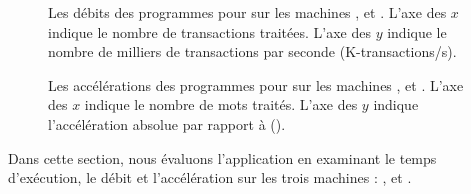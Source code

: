 \begin{figure}




\caption[Les débits pour  sur
les machines ,  et .]{Les débits des programmes
pour  sur les machines ,  et . L'axe des $x$
indique le nombre de transactions traitées. L'axe des $y$ indique le nombre de milliers de transactions par seconde (K-transactions/s).}
\label{StockPrice-debits.fig}
\end{figure}


\begin{figure}




\caption[Les accélérations pour  sur les machines ,
 et .]{Les accélérations des programmes pour  sur
les machines ,  et . L'axe des $x$ indique le nombre de mots
traités. L'axe des $y$ indique l'accélération absolue par rapport à
 ().}
\label{StockPrice-accs.fig}
\end{figure}





Dans cette section, nous \'evaluons l'application  en examinant le temps d'ex\'ecution, le d\'ebit et l'accélération sur les trois machines : ,  et . 

